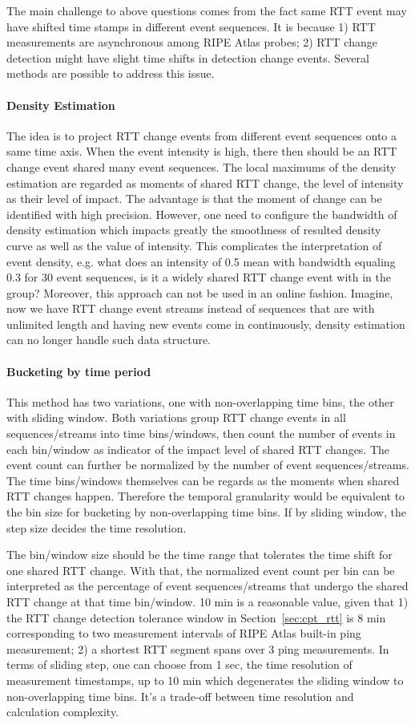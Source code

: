 The main challenge to above questions comes from the fact same RTT event may have shifted time stamps in different event sequences. It is because 1) RTT measurements are asynchronous among RIPE Atlas probes; 2) RTT change detection might have slight time shifts in detection change events.
Several methods are possible to address this issue.


\paragraph{Density Estimation} The idea is to project RTT change events from different event sequences onto a same time axis. When the event intensity is high, there then should be an RTT change event shared many event sequences. The local maximums of the density estimation are regarded as moments of shared RTT change, the level of intensity  as their level of impact. The advantage is that the moment of change can be identified with high precision. However, one need to configure the bandwidth of density estimation which impacts greatly the smoothness of resulted density curve as well as the value of intensity. This complicates the interpretation of event density, e.g. what does an intensity of 0.5 mean with bandwidth equaling 0.3 for 30 event sequences, is it a widely shared RTT change event with in the group? Moreover, this approach can not be used in an online fashion. Imagine, now we have RTT change event streams instead of sequences that are with unlimited length and having new events come in continuously, density estimation can no longer handle such data structure.

\paragraph{Bucketing by time period} This method has two variations, one with non-overlapping time bins, the other with sliding window. Both variations group RTT change events in all sequences/streams into time bins/windows, then count the number of events in each bin/window as indicator of the impact level of shared RTT changes. The event count can further be normalized by the number of event sequences/streams. 
The time bins/windows themselves can be regards as the moments when shared RTT changes happen. Therefore the temporal granularity would be equivalent to the bin size for bucketing by non-overlapping time bins. If by sliding window, the step size decides the time resolution.

The bin/window size should be the time range that tolerates the time shift for one shared RTT change. With that, the normalized event count per bin can be interpreted as the percentage of event sequences/streams that undergo the shared RTT change at that time bin/window. 
10 min is a reasonable value, given that 1) the RTT change detection tolerance window in Section~\ref{sec:cpt_rtt} is 8 min corresponding to two measurement intervals of RIPE Atlas built-in ping measurement; 2) a shortest RTT segment spans over 3 ping measurements.
In terms of sliding step, one can choose from 1 sec, the time resolution of measurement timestamps, up to 10 min which degenerates the sliding window to non-overlapping time bins. It's a trade-off between time resolution and calculation complexity.

